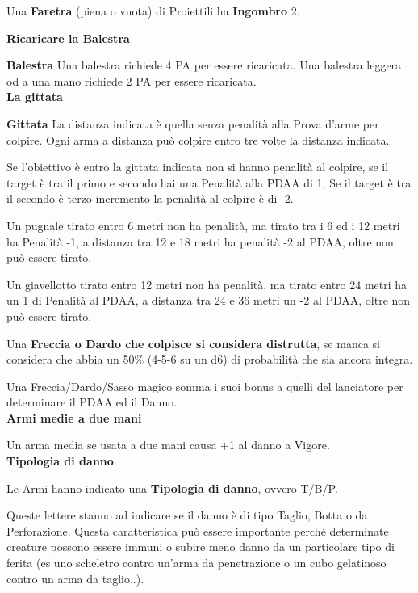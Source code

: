 \documentclass[12pt,a4paper,twoside,openany]{book}
\begin{document}
\medskip

Una \textbf{Faretra} (piena o vuota) di Proiettili ha \textbf{Ingombro} 2.\\

\pagebreak

\begin{multicols}{2}
	
\textbf{Ricaricare la Balestra}	
	
\textbf{Balestra}
Una balestra richiede 4 PA per essere ricaricata. Una balestra leggera od a una mano richiede 2 PA per essere ricaricata.\\

\textbf{La gittata}

\textbf{Gittata}
La distanza indicata è quella senza penalità alla Prova d'arme per colpire. Ogni arma a distanza può colpire entro tre volte la distanza indicata.

Se l'obiettivo è entro la gittata indicata non si hanno penalità al colpire, se il target è tra il primo e secondo hai una Penalità alla PDAA di 1, Se il target è tra il secondo è terzo incremento la penalità al colpire è di -2.

Un pugnale tirato entro 6 metri non ha penalità, ma tirato tra i 6 ed i 12 metri ha Penalità -1, a distanza tra 12 e 18 metri ha penalità -2 al PDAA, oltre non può essere tirato.

Un giavellotto tirato entro 12 metri non ha penalità, ma tirato entro 24 metri ha un 1 di Penalità al PDAA, a distanza tra 24 e 36 metri un -2 al PDAA, oltre non può essere tirato.

Una \textbf{Freccia o Dardo che colpisce si considera distrutta}, se manca si considera che abbia un 50\% (4-5-6 su un d6) di probabilità che sia ancora integra.

Una Freccia/Dardo/Sasso magico somma i suoi bonus a quelli del lanciatore per determinare il PDAA ed il Danno.\\

\textbf{Armi medie a due mani}

Un arma media se usata a due mani causa +1 al danno a Vigore.\\

\textbf{Tipologia di danno}

Le Armi hanno indicato una \textbf{Tipologia di danno}, ovvero T/B/P.

Queste lettere stanno ad indicare se il danno è di tipo Taglio, Botta o da Perforazione. Questa caratteristica può essere importante perché determinate creature possono essere immuni o subire meno danno da un particolare tipo di ferita (es uno scheletro contro un'arma da penetrazione o un cubo gelatinoso contro un arma da taglio..).


\end{multicols}
\end{document}
